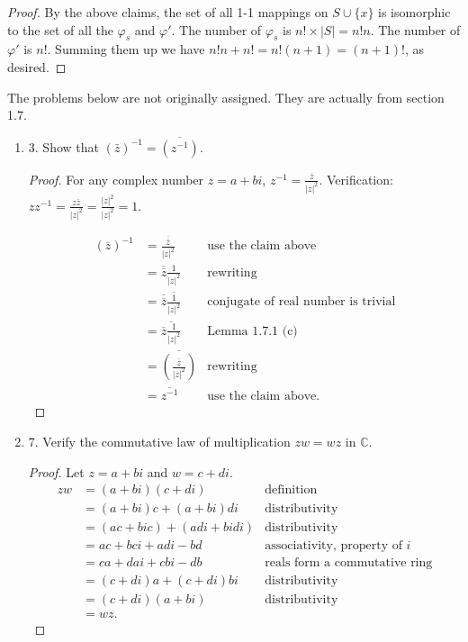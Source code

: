 \begin{enumerate}[resume]
\begin{proof}
By the above claims, the set of all 1-1 mappings on $S \cup \{x\} $ is isomorphic to the set of all the $\varphi_s$ and  $\varphi'$. The number of $\varphi_s$ is $n! \times |S| = n! n$. The number of $\varphi'$ is $n!$. Summing them up we have $n!n + n! = n!(n+1) = (n+1)!$, as desired.

\end{proof}

\end{enumerate}
\begin{remark}
	\color{red}
	The problems below are not originally assigned. They are actually from section 1.7.
\end{remark}
\begin{enumerate}[resume]
	\item 3. Show that $(\bar{z})^{-1}=\overline{\left(z^{-1}\right)}$.
\begin{proof}
	For any complex number $z = a+bi$, $z^{-1} = \frac{\overline{z}}{\left| z \right|^2 }$. Verification: $z z^{-1} = \frac{z \overline{z}}{|z|^2} = \frac{|z|^2}{|z|^2}= 1$.

	\begin{align*}
		\left( \overline{z} \right) ^{-1}
		&= \frac{\overline{\overline{z}}}{|z|^2} & \text{use the claim above}\\
		&= \overline{\overline{z}}\frac{1}{|z|^2} & \text{rewriting}\\
		&= \overline{\overline{z}}\overline{\frac{1}{|z|^2}} &\text{conjugate of real number is trivial}\\
		&= \overline{\overline{z}\frac{1}{|z|^2}} &\text{Lemma 1.7.1 (c)}\\
		&= \overline{\left( \frac{\overline{z}}{|z|^2} \right) } &\text{rewriting}\\
		&= \overline{z ^{-1}} & \text{use the claim above}
	.\end{align*}
\end{proof}

	\item 7. Verify the commutative law of multiplication $z w=w z$ in $\mathbb{C}$.
\begin{proof}
	Let $z = a+bi $ and $w = c+di $.
	\begin{align*}
		zw &= (a+bi)(c+di) & \text{definition}\\
		   &= (a+bi)c + (a+bi)di & \text{distributivity}\\
		   &= (ac+bic) + (adi+bidi) & \text{distributivity}\\
		   &= ac+bci + adi-bd & \text{associativity, property of $i$}\\
		   &= ca+ dai+cbi -db & \text{reals form a commutative ring}\\
		   &= (c+di)a+(c+di)bi &\text{distributivity}\\
		   &= (c+di)(a+bi)&\text{distributivity}\\
		   &= wz
	.\end{align*}
	

\end{proof}
\end{enumerate}
